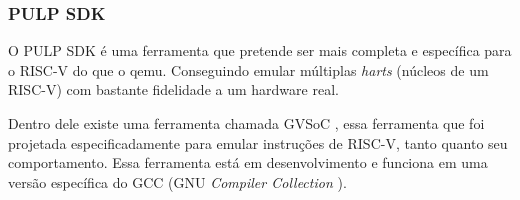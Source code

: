\subsubsection{PULP SDK}

O PULP SDK \cite{PulpSDKRepositorio} é uma ferramenta que pretende ser mais completa e específica para o RISC-V do que o qemu. 
Conseguindo emular múltiplas \textit{harts} (núcleos de um RISC-V) com bastante fidelidade a um hardware real.

Dentro dele existe uma ferramenta chamada GVSoC \cite{9643828}, essa ferramenta que foi projetada especificadamente para emular 
instruções de RISC-V, tanto quanto seu comportamento. Essa ferramenta está em desenvolvimento e funciona em uma versão específica do 
GCC (GNU \textit{Compiler Collection} \cite{GCC}).
